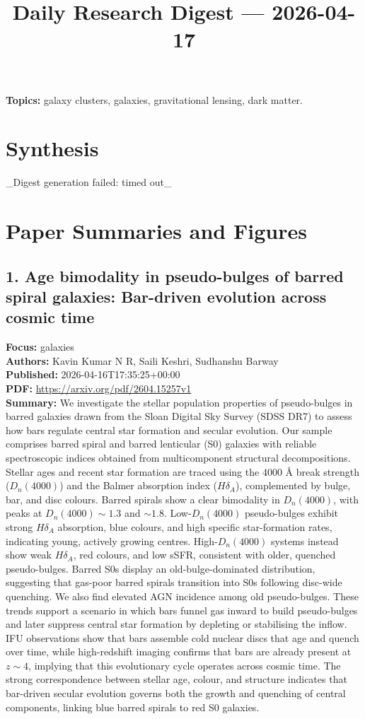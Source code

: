 \documentclass[11pt]{article}
\begin{document}
\title{Daily Research Digest --- 2026-04-17}
\author{}
\date{}
\maketitle
\textbf{Topics:} galaxy clusters, galaxies, gravitational lensing, dark matter.
\section*{Synthesis}
\_Digest generation failed: timed out\_
\newpage
\section*{Paper Summaries and Figures}
\subsection*{1. Age bimodality in pseudo-bulges of barred spiral galaxies: Bar-driven evolution across cosmic time}
\textbf{Focus:} galaxies\\
\textbf{Authors:} Kavin Kumar N R, Saili Keshri, Sudhanshu Barway\\
\textbf{Published:} 2026-04-16T17:35:25+00:00\\
\textbf{PDF:} \href{https://arxiv.org/pdf/2604.15257v1}{https://arxiv.org/pdf/2604.15257v1}\\
\textbf{Summary:}
We investigate the stellar population properties of pseudo-bulges in barred galaxies drawn from the Sloan Digital Sky Survey (SDSS DR7) to assess how bars regulate central star formation and secular evolution. Our sample comprises barred spiral and barred lenticular (S0) galaxies with reliable spectroscopic indices obtained from multicomponent structural decompositions. Stellar ages and recent star formation are traced using the 4000 Å break strength ($D_{n}(4000)$) and the Balmer absorption index ($H\delta _{A}$), complemented by bulge, bar, and disc colours. Barred spirals show a clear bimodality in $D_{n}(4000)$, with peaks at $D_{n}(4000)\sim1.3$ and $\sim1.8$. Low-$D_{n}(4000)$ pseudo-bulges exhibit strong $H\delta _{A}$ absorption, blue colours, and high specific star-formation rates, indicating young, actively growing centres. High-$D_{n}(4000)$ systems instead show weak $H\delta _{A}$, red colours, and low sSFR, consistent with older, quenched pseudo-bulges. Barred S0s display an old-bulge-dominated distribution, suggesting that gas-poor barred spirals transition into S0s following disc-wide quenching. We also find elevated AGN incidence among old pseudo-bulges. These trends support a scenario in which bars funnel gas inward to build pseudo-bulges and later suppress central star formation by depleting or stabilising the inflow. IFU observations show that bars assemble cold nuclear discs that age and quench over time, while high-redshift imaging confirms that bars are already present at $z\sim4$, implying that this evolutionary cycle operates across cosmic time. The strong correspondence between stellar age, colour, and structure indicates that bar-driven secular evolution governs both the growth and quenching of central components, linking blue barred spirals to red S0 galaxies.
\newpage
\end{document}
